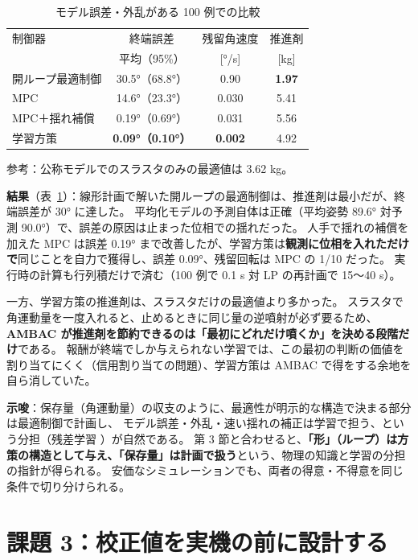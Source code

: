 \documentclass[paper=a4paper,fontsize=10pt,twocolumn,column_gap=2zw,line_length=24zw,number_of_lines=46,head_space=20mm]{jlreq}
\begin{document}
\begin{table}[t]\centering\small
\caption{モデル誤差・外乱がある 100 例での比較}\label{tab:robust}
\setlength{\tabcolsep}{4pt}\begin{tabular}{lccc}\toprule
制御器 & 終端誤差 & 残留角速度 & 推進剤 \\
 & 平均（95\%） & [°/s] & [kg] \\\midrule
開ループ最適制御 & 30.5°（68.8°） & 0.90 & \textbf{1.97} \\
MPC & 14.6°（23.3°） & 0.030 & 5.41 \\
MPC＋揺れ補償 & 0.19°（0.69°） & 0.031 & 5.56 \\
学習方策 & \textbf{0.09°（0.10°）} & \textbf{0.002} & 4.92 \\\bottomrule
\end{tabular}
\vspace{1pt}\par\footnotesize 参考：公称モデルでのスラスタのみの最適値は 3.62 kg。
\end{table}

\textbf{結果}（表~\ref{tab:robust}）：線形計画で解いた開ループの最適制御は、推進剤は最小だが、終端誤差が 30° に達した。
平均化モデルの予測自体は正確（平均姿勢 89.6° 対予測 90.0°）で、誤差の原因は止まった位相での揺れだった。
人手で揺れの補償を加えた MPC は誤差 0.19° まで改善したが、学習方策は\textbf{観測に位相を入れただけで}同じことを自力で獲得し、誤差 0.09°、残留回転は MPC の 1/10 だった。
実行時の計算も行列積だけで済む（100 例で 0.1 s 対 LP の再計画で 15〜40 s）。

一方、学習方策の推進剤は、スラスタだけの最適値より多かった。
スラスタで角運動量を一度入れると、止めるときに同じ量の逆噴射が必ず要るため、\textbf{AMBAC が推進剤を節約できるのは「最初にどれだけ噴くか」を決める段階だけ}である。
報酬が終端でしか与えられない学習では、この最初の判断の価値を割り当てにくく（信用割り当ての問題）、学習方策は AMBAC で得をする余地を自ら消していた。

\textbf{示唆}：保存量（角運動量）の収支のように、最適性が明示的な構造で決まる部分は最適制御で計画し、
モデル誤差・外乱・速い揺れの補正は学習で担う、という分担（残差学習 \cite{johannink2019}）が自然である。
第 3 節と合わせると、\textbf{「形」（ループ）は方策の構造として与え、「保存量」は計画で扱う}という、物理の知識と学習の分担の指針が得られる。
安価なシミュレーションでも、両者の得意・不得意を同じ条件で切り分けられる。

\section{課題 3：校正値を実機の前に設計する}
\end{document}

